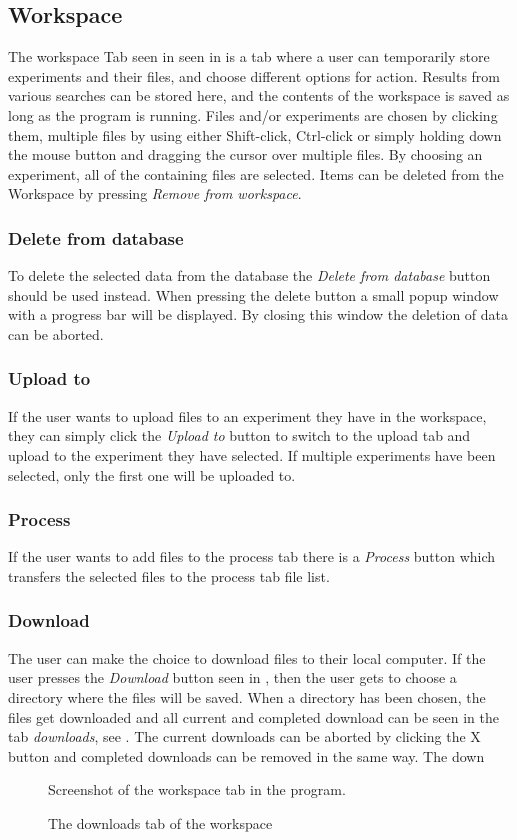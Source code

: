 \subsection{Workspace} \label{sec:des_workspace}
The workspace Tab seen in  seen in  is a tab where a user can temporarily store experiments and their files, and choose different options for action. Results from various searches can be stored here, and the contents of the workspace is saved as long as the program is running. Files and/or experiments are chosen by clicking them, multiple files by using either Shift-click, Ctrl-click or simply holding down the mouse button and dragging the cursor over multiple files. By choosing an experiment, all of the containing files are selected. Items can be deleted from the Workspace by pressing \emph{Remove from workspace}.
\subsubsection{Delete from database}
To delete the selected data from the database the \emph{Delete from database} button should be used instead. When pressing the delete button a small popup window with a progress bar will be displayed. By closing this window the deletion of data can be aborted.
\subsubsection{Upload to}
If the user wants to upload files to an experiment they have in the workspace, they can simply click the \emph{Upload to} button to switch to the upload tab and upload to the experiment they have selected. If multiple experiments have been selected, only the first one will be uploaded to.
\subsubsection{Process}
If the user wants to add files to the process tab there is a \emph{Process} button which transfers the selected files to the process tab file list.
\subsubsection{Download}
The user can make the choice to download files to their local computer. If the user presses the \emph{Download} button seen in , then the user gets to choose a directory where the files will be saved. When a directory has been chosen, the files get downloaded and all current and completed download can be seen in the tab \emph{downloads}, see . The current downloads can be aborted by clicking the X button and completed downloads can be removed in the same way. The down
\begin{figure}[htb]
	\caption{Screenshot of the workspace tab in the program.}
	\label{fig:des_workspace-view}
\end{figure}
\begin{figure}[htb]
	\caption{The downloads tab of the workspace}
	\label{fig:des_download-view}
\end{figure}
\FloatBarrier

